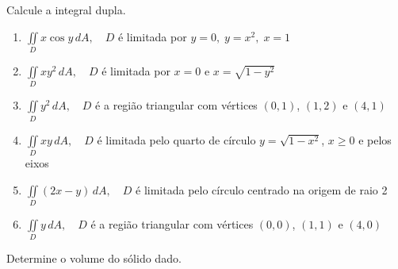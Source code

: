 \documentclass[a4paper, 12pt]{article}
\begin{document}
	Calcule a integral dupla.
	
	\begin{enumerate}[resume]
	
		\item $\displaystyle \iint \limits_{D} x \cos y \, dA, \quad D$ é limitada por $y = 0, \; y = x^2, \; x = 1$
		
		\item $\displaystyle \iint \limits_{D} xy^2 \, dA, \quad D$ é limitada por $x = 0$ e $x = \sqrt{1 - y^2}$
		
		\item $\displaystyle \iint \limits_{D} y^2 \, dA, \quad D$ é a região triangular com vértices $(0,1)$, $(1,2)$ e $(4,1)$
		
		\item $\displaystyle \iint \limits_{D} xy \, dA, \quad D$ é limitada pelo quarto de círculo $y = \sqrt{1 - x^2}$, $x \geq 0$ e pelos eixos
		
		\item $\displaystyle \iint \limits_{D} (2x - y) \, dA, \quad D$ é limitada pelo círculo centrado na origem de raio 2
		
		\item $\displaystyle \iint \limits_{D} y \, dA, \quad D$ é a região triangular com vértices $(0,0)$, $(1,1)$ e $(4,0)$
	
	\end{enumerate}
	
	\vspace{5mm}
	
	Determine o volume do sólido dado.
	
\end{document}
